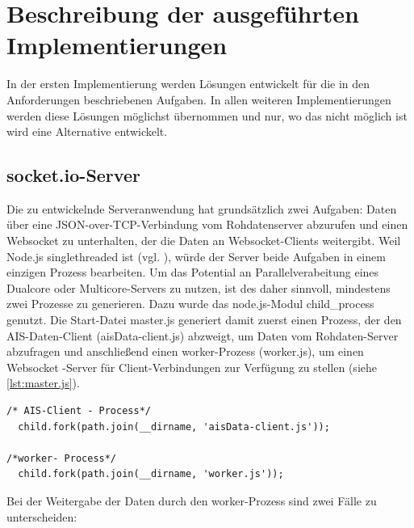 \section{Beschreibung der ausgeführten Implementierungen}
In der ersten Implementierung werden Lösungen entwickelt für die in den Anforderungen beschriebenen Aufgaben. In allen weiteren Implementierungen werden diese Lösungen möglichst übernommen und nur, wo das nicht möglich ist wird eine Alternative entwickelt.

\subsection{socket.io-Server}\label{socket.io-Server}
Die zu entwickelnde Serveranwendung hat grundsätzlich zwei Aufgaben: Daten über eine JSON-over-TCP-Verbindung vom Rohdatenserver abzurufen und einen Websocket zu unterhalten, der die Daten an Websocket-Clients weitergibt.
Weil Node.js singlethreaded ist (vgl. \cite{teixeira}), würde der Server beide Aufgaben in einem einzigen Prozess bearbeiten. Um das Potential an Parallelverabeitung eines Dualcore oder Multicore-Servers zu nutzen, ist des daher sinnvoll, mindestens zwei Prozesse zu generieren. Dazu wurde das node.js-Modul child\_process genutzt. Die Start-Datei master.js generiert damit zuerst einen Prozess, der den AIS-Daten-Client (aisData-client.js) abzweigt, um Daten vom Rohdaten-Server abzufragen und anschließend einen worker-Prozess (worker.js), um einen Websocket -Server für Client-Verbindungen zur Verfügung zu stellen (siehe \ref{lst:master.js}).
\begin{lstlisting}[caption=Generierung von Kindprozessen in master.js, firstnumber=16, label=master.js]
/* AIS-Client - Process*/
  child.fork(path.join(__dirname, 'aisData-client.js'));

/*worker- Process*/
  child.fork(path.join(__dirname, 'worker.js'));
\end{lstlisting}
Bei der Weitergabe der Daten durch den worker-Prozess sind zwei Fälle zu unterscheiden:
